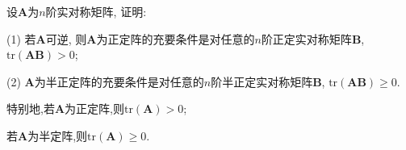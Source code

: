 \documentclass[../../main.tex]{subfiles}
\begin{document}
\begin{proposition}\label{proposition:正定和半正定阵关于迹的判定准则}
设$\boldsymbol{A}$为$n$阶实对称矩阵, 证明:

(1) 若$\boldsymbol{A}$可逆, 则$\boldsymbol{A}$为正定阵的充要条件是对任意的$n$阶正定实对称矩阵$\boldsymbol{B}$, $\text{tr}(\boldsymbol{A}\boldsymbol{B})>0$;

(2) $\boldsymbol{A}$为半正定阵的充要条件是对任意的$n$阶半正定实对称矩阵$\boldsymbol{B}$, $\text{tr}(\boldsymbol{A}\boldsymbol{B})\geqslant  0$.
\end{proposition}
\begin{remark}
特别地,若$\boldsymbol{A}$为正定阵,则$\text{tr}(\boldsymbol{A})>0$;

若$\boldsymbol{A}$为半定阵,则$\text{tr}(\boldsymbol{A})\geqslant  0$.
\end{remark}
\end{document}
